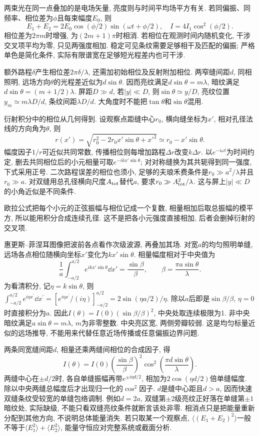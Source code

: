 \label{ch:interference}
两束光在同一点叠加的是电场矢量, 亮度则与时间平均场平方有关. 若同偏振、同频率、相位差为$\phi$且每束幅度$E_0$, 则
\[
E_1+E_2=2E_0\cos(\phi/2)\sin(\omega t+\phi/2),\quad
I=4I_1\cos^2(\phi/2).
\]
相位差为$2\pi m$时增强, 为$(2m+1)\pi$时相消. 若相位在观测时间内随机变化, 干涉交叉项平均为零, 只见两强度相加. 稳定可见条纹需要足够相干及匹配的偏振; 严格单色是简化条件, 实际有限谱宽在足够短光程差内也可干涉.

额外路程$\delta$产生相位差$2\pi\delta/\lambda$, 还需加初始相位及反射附加相位. 两窄缝间距$d$, 同相照明, 远场方向$\theta$的光程差近似为$d\sin\theta$. 因而亮纹满足$d\sin\theta=m\lambda$, 暗纹满足$d\sin\theta=(m+1/2)\lambda$. 屏距$D\gg d$, 若$|y|\ll D$, 则$\sin\theta\simeq y/D$, 亮纹位置$y_m\simeq m\lambda D/d$, 条纹间距$\lambda D/d$. 大角度时不能把$\tan\theta$和$\sin\theta$混用.

衍射积分中的相位从几何得到. 设观察点距缝中心$r_0$, 横向缝坐标为$x'$, 相对孔径法线的方向角为$\theta$, 则
\[
r(x')=\sqrt{r_0^2-2r_0x'\sin\theta+x'^2}\simeq r_0-x'\sin\theta.
\]
幅度因子$1/r$可近似共同常数, 传播相位则每增加路程$\Delta r$改变$k\Delta r$. 以$e^{-i\omega t}$为时间约定, 删去共同相位后的小元相量可取$e^{-ikx'\sin\theta}$; 对对称缝换为其共轭得到同一强度, 下式采用正号. 二次路程误差的相位也须小, 足够的夫琅禾费条件是$r_0\gg a^2/\lambda$并且$r_0\gg a$. 对双缝用总孔径横向尺度$A_{\rm tot}$替代$a$, 要求$r_0\gg A_{\rm tot}^2/\lambda$. 这与屏上$|y|\ll D$的小角近似是不同条件.

欧拉公式把每个小元的正弦振幅与相位记成一个复数, 相量相加后取总振幅的模平方, 所以能用积分合成连续孔径. 这不是把各小元强度直接相加, 后者会删掉衍射的交叉项.

惠更斯--菲涅耳图像把波前各点看作次级波源, 再叠加其场. 对宽$a$的均匀照明单缝, 远场各点相位随横向坐标$x'$变化为$kx'\sin\theta$. 相量幅度相对于中央值为
\[
\frac1a\int_{-a/2}^{a/2}e^{ikx'\sin\theta}\dd x'
=\frac{\sin\beta}{\beta},\qquad \beta=\frac{\pi a\sin\theta}{\lambda}.
\]
为看清积分, 记$\eta=k\sin\theta$, 则$\int_{-a/2}^{a/2}e^{i\eta x^{\prime}}\dd x^{\prime}=[e^{i\eta x^{\prime}}/(i\eta)]_{-a/2}^{a/2}=2\sin(\eta a/2)/\eta$. 除以$a$后即是$\sin\beta/\beta$, $\eta=0$时直接积分为$a$. 因此$I(\theta)=I(0)(\sin\beta/\beta)^2$, 中央处取连续极限为1. 非中央暗纹满足$a\sin\theta=m\lambda$, $m$为非零整数. 中央亮区宽, 两侧旁瓣较弱. 这是均匀标量近似的远场推导, 不能用来代替任意近场传播或任意偏振边界问题.

两条同宽缝间距$d$, 相量还乘两缝间相位的合成因子, 得
\[
I(\theta)=I(0)\left(\frac{\sin\beta}{\beta}\right)^2
\cos^2\left(\frac{\pi d\sin\theta}{\lambda}\right).
\]
两缝中心在$\pm d/2$时, 各自单缝振幅再带$e^{\pm i\eta d/2}$, 相加为$2\cos(\eta d/2)$倍单缝幅度. 除以中央两缝总幅度后才出现归一化的$\cos^2$因子. $d$是缝中心距且$d>a$, 因而快速双缝条纹受较宽的单缝包络调制. 例如$d=2a$, 双缝第$\pm2$级亮纹正好落在单缝第$\pm1$暗纹处, 实际缺级, 不能只看双缝亮纹条件就断言该处非零. 相消点只是把能量重新分配到其他方向, 不说明总体能量消失. 若只取某一个观察点, $\langle(E_1+E_2)^2\rangle$一般不等于$\langle E_1^2\rangle+\langle E_2^2\rangle$, 能量守恒应对完整系统或截面分析.

